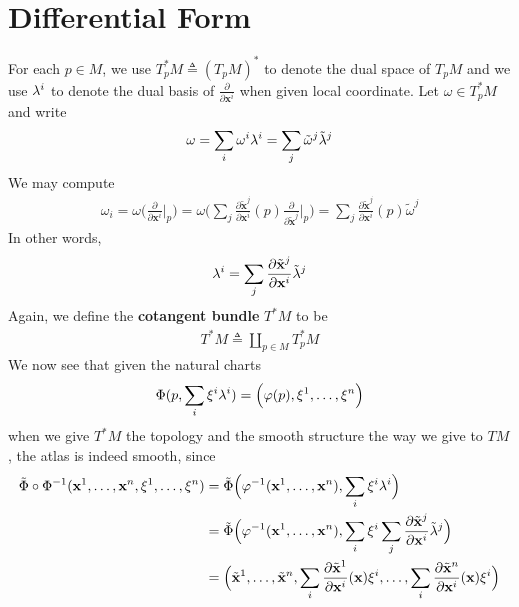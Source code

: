 \documentclass{report}
\begin{document}
\section{Differential Form}
\begin{abstract}

\end{abstract}
\begin{mdframed}
For each $p \in M$, we use $T^*_pM\triangleq (T_pM)^*$ to denote the dual space of $T_pM$ and we use $\lambda ^i$ to denote the dual basis of $\frac{\partial }{\partial \textbf{x}^i}$ when given local coordinate. Let $\omega \in T_p^*M$ and write 
\begin{align*}
\omega = \sum_i \omega^i \lambda^i = \sum_j \tilde{\omega}^j \tilde{\lambda}^j   
\end{align*}
We may compute 
\begin{align*}
  \omega_i= \omega \Big( \frac{\partial }{\partial \textbf{x}^i}\Big|_p \Big)= \omega \Big( \sum_j \frac{\partial \tilde{\textbf{x}}^j }{\partial \textbf{x}^i}(p) \frac{\partial }{\partial \tilde{\textbf{x}}^j }\Big|_p \Big)= \sum_j \frac{\partial \tilde{\textbf{x}}^j }{\partial \textbf{x}^i} (p)\tilde{\omega}^j 
\end{align*}
In other words, 
\begin{align*}
\lambda ^i= \sum_{j} \frac{\partial \tilde{\textbf{x}}^j }{\partial \textbf{x}^i} \tilde{\lambda }^j 
\end{align*}
Again, we define the \textbf{cotangent bundle} $T^*M$ to be 
\begin{align*}
T^*M\triangleq \coprod_{p \in M}T_p^*M
\end{align*}
We now see that given the natural charts 
\begin{align*}
\Phi (p,\sum_i \xi^i\lambda^i )= \Big(\varphi (p),\xi^1,\dots ,\xi^n \Big)
\end{align*}
when we give $T^*M$ the topology and the smooth structure the way we give to  $TM$, the atlas is indeed smooth, since 
 \begin{align*}
\tilde{\Phi}\circ \Phi^{-1}(\textbf{x}^1,\dots ,\textbf{x}^n,\xi^1,\dots ,\xi^n)&= \tilde{\Phi}\Big(\phi^{-1}(\textbf{x}^1,\dots ,\textbf{x}^n), \sum_{i} \xi^i \ld^i \Big) \\
&= \tilde{\Phi}\Big(\phi^{-1}(\textbf{x}^1,\dots ,\textbf{x}^n), \sum_{i} \xi^i \sum_j  \frac{\partial \tilde{\textbf{x}}^j }{\partial \textbf{x}^i}\tilde{\ld}^j  \Big) \\
&=\Big(\tilde{\textbf{x}}^1,\dots, \tilde{\textbf{x}}^n, \sum_i \frac{\partial \tilde{\textbf{x}}^1 }{\partial \textbf{x}^i} (\textbf{x})\xi^i ,\dots , \sum_i  \frac{\partial \tilde{\textbf{x}}^n }{\partial \textbf{x}^i} (\textbf{x})\xi^i \Big)

\end{align*}
\end{mdframed}
\end{document}
